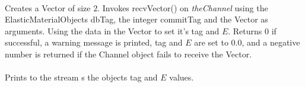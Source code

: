 \\
Creates a Vector of size $2$. Invokes recvVector() on  {\em
theChannel} using the ElasticMaterialObjects \p dbTag, the integer
\p commitTag and the Vector as arguments. Using the data in the
Vector to set it's \p tag and $E$. Returns $0$ if successful, a
warning message is printed, \p tag and $E$ are set to $0.0$, and a
negative number is returned if the Channel object fails to receive
the Vector. \\

 \\
Prints to the stream \p s the objects \p tag and $E$ values. \\
